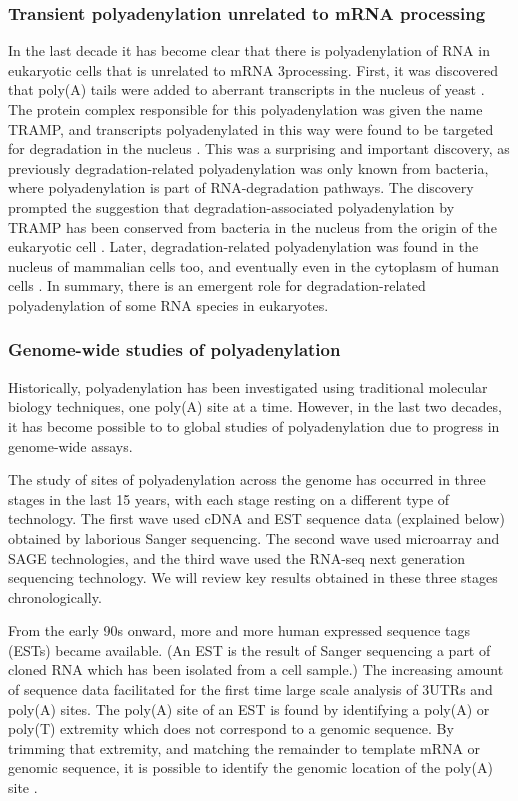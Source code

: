 \subsubsection{Transient polyadenylation unrelated to mRNA processing}
In the last decade it has become clear that there is polyadenylation of RNA in
eukaryotic cells that is unrelated to mRNA 3\ppp processing. First, it was
discovered that poly(A) tails were added to aberrant transcripts in the nucleus
of yeast \cite{wyers_cryptic_2005}. The protein complex responsible for this
polyadenylation was given the name TRAMP, and transcripts polyadenylated in
this way were found to be targeted for degradation in the nucleus
\cite{lacava_rna_2005, wyers_cryptic_2005}. This was a surprising and important
discovery, as previously degradation-related polyadenylation was only known
from bacteria, where polyadenylation is part of RNA-degradation pathways. The
discovery prompted the suggestion that degradation-associated polyadenylation
by TRAMP has been conserved from bacteria in the nucleus from the origin of the
eukaryotic cell \cite{lacava_rna_2005}. Later, degradation-related
polyadenylation was found in the nucleus of mammalian cells too, and eventually
even in the cytoplasm of human cells \cite{slomovic_polyadenylation_2006,
slomovic_addition_2010}. In summary, there is an emergent role for
degradation-related polyadenylation of some RNA species in eukaryotes.

\subsubsection{Genome-wide studies of polyadenylation}
Historically, polyadenylation has been investigated using traditional molecular
biology techniques, one poly(A) site at a time. However, in the last two
decades, it has become possible to to global studies of polyadenylation due to
progress in genome-wide assays.

The study of sites of polyadenylation across the genome has occurred in three
stages in the last 15 years, with each stage resting on a different type of
technology. The first wave used cDNA and EST sequence data (explained below)
obtained by laborious Sanger sequencing. The second wave used microarray and
SAGE technologies, and the third wave used the RNA-seq next generation
sequencing technology. We will review key results obtained in these three
stages chronologically.

From the early 90s onward, more and more human expressed sequence tags (ESTs)
became available. (An EST is the result of Sanger sequencing a part of cloned
RNA which has been isolated from a cell sample.) The increasing amount of
sequence data facilitated for the first time large scale analysis of 3\ppp UTRs
and poly(A) sites. The poly(A) site of an EST is found by identifying a poly(A)
or poly(T) extremity which does not correspond to a genomic sequence. By
trimming that extremity, and matching the remainder to template mRNA or genomic
sequence, it is possible to identify the genomic location of the poly(A) site
\cite{beaudoing_patterns_2000, tian_large-scale_2005}.

